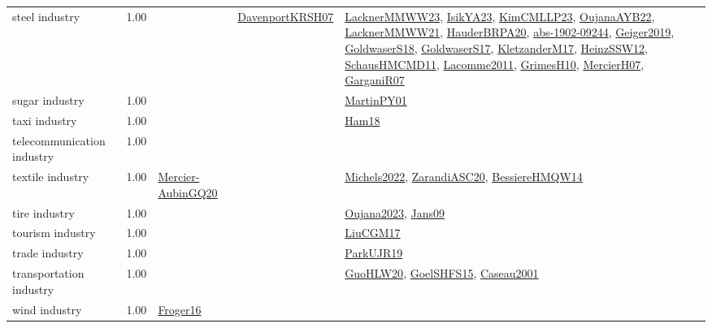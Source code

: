 {\begin{longtable}{p{3cm}r>{\raggedright\arraybackslash}p{6cm}>{\raggedright\arraybackslash}p{6cm}>{\raggedright\arraybackslash}p{8cm}}
\index{steel industry}\index{Industries!steel industry}steel industry &  1.00 &  & \hyperref[detail:DavenportKRSH07]{DavenportKRSH07} & \hyperref[detail:LacknerMMWW23]{LacknerMMWW23}, \hyperref[detail:IsikYA23]{IsikYA23}, \hyperref[detail:KimCMLLP23]{KimCMLLP23}, \hyperref[detail:OujanaAYB22]{OujanaAYB22}, \hyperref[detail:LacknerMMWW21]{LacknerMMWW21}, \hyperref[detail:HauderBRPA20]{HauderBRPA20}, \hyperref[detail:abs-1902-09244]{abs-1902-09244}, \hyperref[detail:Geiger2019]{Geiger2019}, \hyperref[detail:GoldwaserS18]{GoldwaserS18}, \hyperref[detail:GoldwaserS17]{GoldwaserS17}, \hyperref[detail:KletzanderM17]{KletzanderM17}, \hyperref[detail:HeinzSSW12]{HeinzSSW12}, \hyperref[detail:SchausHMCMD11]{SchausHMCMD11}, \hyperref[detail:Lacomme2011]{Lacomme2011}, \hyperref[detail:GrimesH10]{GrimesH10}, \hyperref[detail:MercierH07]{MercierH07}, \hyperref[detail:GarganiR07]{GarganiR07}\\
\index{sugar industry}\index{Industries!sugar industry}sugar industry &  1.00 &  &  & \hyperref[detail:MartinPY01]{MartinPY01}\\
\index{taxi industry}\index{Industries!taxi industry}taxi industry &  1.00 &  &  & \hyperref[detail:Ham18]{Ham18}\\
\index{telecommunication industry}\index{Industries!telecommunication industry}telecommunication industry &  1.00 &  &  & \\
\index{textile industry}\index{Industries!textile industry}textile industry &  1.00 & \hyperref[detail:Mercier-AubinGQ20]{Mercier-AubinGQ20} &  & \hyperref[detail:Michels2022]{Michels2022}, \hyperref[detail:ZarandiASC20]{ZarandiASC20}, \hyperref[detail:BessiereHMQW14]{BessiereHMQW14}\\
\index{tire industry}\index{Industries!tire industry}tire industry &  1.00 &  &  & \hyperref[detail:Oujana2023]{Oujana2023}, \hyperref[detail:Jans09]{Jans09}\\
\index{tourism industry}\index{Industries!tourism industry}tourism industry &  1.00 &  &  & \hyperref[detail:LiuCGM17]{LiuCGM17}\\
\index{trade industry}\index{Industries!trade industry}trade industry &  1.00 &  &  & \hyperref[detail:ParkUJR19]{ParkUJR19}\\
\index{transportation industry}\index{Industries!transportation industry}transportation industry &  1.00 &  &  & \hyperref[detail:GuoHLW20]{GuoHLW20}, \hyperref[detail:GoelSHFS15]{GoelSHFS15}, \hyperref[detail:Caseau2001]{Caseau2001}\\
\index{wind industry}\index{Industries!wind industry}wind industry &  1.00 & \hyperref[detail:Froger16]{Froger16} &  & \\
\end{longtable}
}

